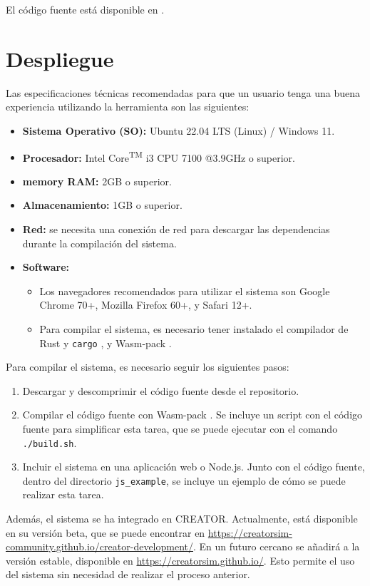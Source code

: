 \let\componentref\undefined

\noindent
El código fuente está disponible en \myrepo.

\FloatBarrier

\section{Despliegue}\label{sec:deployment}

\noindent
Las especificaciones técnicas recomendadas para que un usuario tenga una buena
experiencia utilizando la herramienta son las siguientes:

\begin{itemize}
    \item \textbf{Sistema Operativo (SO):} Ubuntu 22.04 LTS (Linux) / Windows 11.
    \item \textbf{Procesador:} Intel\textsuperscript{\textregistered} Core\textsuperscript{TM} i3 CPU 7100 @3.9GHz o superior.
    \item \textbf{\Gls{memory} RAM:} 2GB o superior.
    \item \textbf{Almacenamiento:} 1GB o superior.
    \item \textbf{Red:} se necesita una conexión de red para descargar las
    dependencias durante la compilación del sistema.
    \item \textbf{Software:}
    \begin{itemize}
        \item Los navegadores recomendados para utilizar el sistema son Google
        Chrome 70+, Mozilla Firefox 60+, y Safari 12+.
        \item Para compilar el sistema, es necesario tener instalado el compilador
        de Rust y \verb!cargo! \parencite{rust-toolchain}, y Wasm-pack
        \parencite{Wasm-pack}.
    \end{itemize}
\end{itemize}

\noindent
Para compilar el sistema, es necesario seguir los siguientes pasos:

\begin{enumerate}
    \item Descargar y descomprimir el código fuente desde el repositorio.
    \item Compilar el código fuente con Wasm-pack \parencite{Wasm-pack}. Se
    incluye un script con el código fuente para simplificar esta tarea,
    que se puede ejecutar con el comando \verb!./build.sh!.
    \item Incluir el sistema en una aplicación web o Node.js. Junto con el
    código fuente, dentro del directorio \verb!js_example!, se incluye un
    ejemplo de cómo se puede realizar esta tarea.
\end{enumerate}

Además, el sistema se ha integrado en CREATOR. Actualmente, está disponible en
su versión beta, que se puede encontrar en
\url{https://creatorsim-community.github.io/creator-development/}. En un futuro
cercano se añadirá a la versión estable, disponible en
\url{https://creatorsim.github.io/}. Esto permite el uso del sistema sin
necesidad de realizar el proceso anterior.

